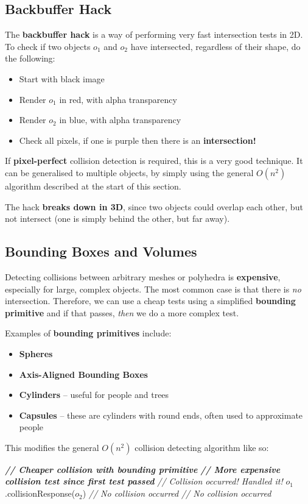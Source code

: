 \documentclass{article}
\begin{document}
\subsection{Backbuffer Hack}

The \textbf{backbuffer hack} is a way of performing very fast intersection tests in 2D. To check if two objects $o_1$ and $o_2$ have intersected, regardless of their shape, do the following:
\begin{itemize}
	\item Start with black image
	\item Render $o_1$ in red, with alpha transparency
	\item Render $o_2$ in blue, with alpha transparency
	\item Check all pixels, if one is purple then there is an \textbf{intersection!}
\end{itemize}
If \textbf{pixel-perfect} collision detection is required, this is a very good technique. It can be generalised to multiple objects, by simply using the general $O(n^2)$ algorithm described at the start of this section.

The hack \textbf{breaks down in 3D}, since two objects could overlap each other, but not intersect (one is simply behind the other, but far away).

\subsection{Bounding Boxes and Volumes}

Detecting collisions between arbitrary meshes or polyhedra is \textbf{expensive}, especially for large, complex objects. The most common case is that there is \textit{no} intersection. Therefore, we can use a cheap tests using a simplified \textbf{bounding primitive} and if that passes, \textit{then} we do a more complex test.

Examples of \textbf{bounding primitives} include:
\begin{itemize}
	\item \textbf{Spheres}
	\item \textbf{Axis-Aligned Bounding Boxes}
	\item \textbf{Cylinders} -- useful for people and trees
	\item \textbf{Capsules} -- these are cylinders with round ends, often used to approximate people
\end{itemize}

This modifies the general $O(n^2)$ collision detecting algorithm like so:
\begin{algorithmic}[1]
		\STATE \textbf{\textit{// Cheaper collision with bounding primitive}}
			\STATE \textbf{\textit{// More expensive collision test since first test passed}}
				\STATE \textit{// Collision occurred! Handled it!}
				\STATE $o_1$.collisionResponse($o_2$)
			\ELSE
				\STATE \textit{// No collision occurred}
			\ENDIF				
		\ELSE
			\STATE \textit{// No collision occurred}
		\ENDIF
	\ENDFOR
\ENDFOR
\end{algorithmic}
\end{document}
